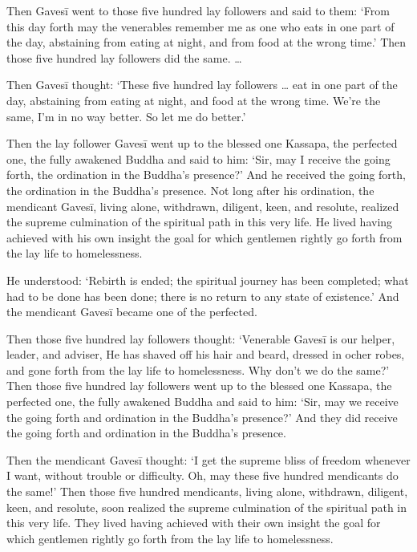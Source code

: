 \documentclass[12pt,openany]{book}%
\begin{document}
Then \textsanskrit{Gavesī} went to those five hundred lay followers and said to them: ‘From this day forth may the venerables remember me as one who eats in one part of the day, abstaining from eating at night, and from food at the wrong time.’ Then those five hundred lay followers did the same. … 

Then \textsanskrit{Gavesī} thought: ‘These five hundred lay followers … eat in one part of the day, abstaining from eating at night, and food at the wrong time. We’re the same, I’m in no way better. So let me do better.’ 

Then the lay follower \textsanskrit{Gavesī} went up to the blessed one Kassapa, the perfected one, the fully awakened Buddha and said to him: ‘Sir, may I receive the going forth, the ordination in the Buddha’s presence?’ And he received the going forth, the ordination in the Buddha’s presence. Not long after his ordination, the mendicant \textsanskrit{Gavesī}, living alone, withdrawn, diligent, keen, and resolute, realized the supreme culmination of the spiritual path in this very life. He lived having achieved with his own insight the goal for which gentlemen rightly go forth from the lay life to homelessness. 

He understood: ‘Rebirth is ended; the spiritual journey has been completed; what had to be done has been done; there is no return to any state of existence.’ And the mendicant \textsanskrit{Gavesī} became one of the perfected. 

Then those five hundred lay followers thought: ‘Venerable \textsanskrit{Gavesī} is our helper, leader, and adviser, He has shaved off his hair and beard, dressed in ocher robes, and gone forth from the lay life to homelessness. Why don’t we do the same?’ Then those five hundred lay followers went up to the blessed one Kassapa, the perfected one, the fully awakened Buddha and said to him: ‘Sir, may we receive the going forth and ordination in the Buddha’s presence?’ And they did receive the going forth and ordination in the Buddha’s presence. 

Then the mendicant \textsanskrit{Gavesī} thought: ‘I get the supreme bliss of freedom whenever I want, without trouble or difficulty. Oh, may these five hundred mendicants do the same!’ Then those five hundred mendicants, living alone, withdrawn, diligent, keen, and resolute, soon realized the supreme culmination of the spiritual path in this very life. They lived having achieved with their own insight the goal for which gentlemen rightly go forth from the lay life to homelessness. 
\end{document}
